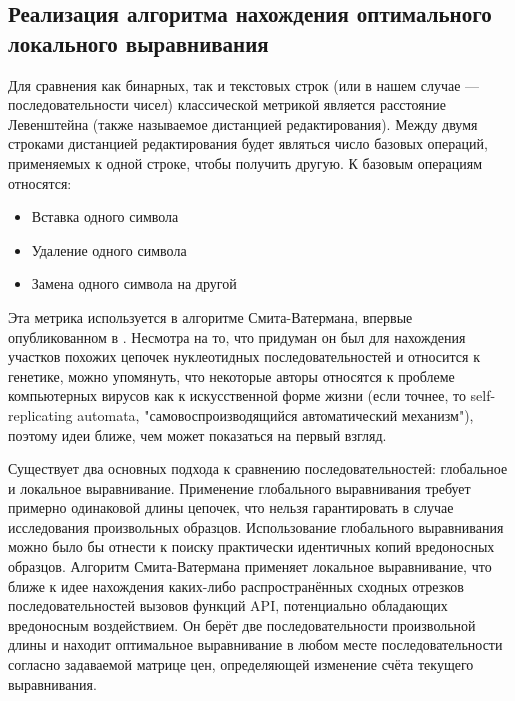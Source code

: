\subsection {Реализация алгоритма нахождения оптимального локального выравнивания}
Для сравнения как бинарных, так и текстовых строк (или в нашем случае --- последовательности чисел) классической метрикой является расстояние Левенштейна (также называемое дистанцией редактирования). Между двумя строками дистанцией редактирования будет являться число базовых операций, применяемых к одной строке, чтобы получить другую. К базовым операциям относятся:
\begin {itemize}
	\item Вставка одного символа
	\item Удаление одного символа
	\item Замена одного символа на другой
\end {itemize}
Эта  метрика используется в алгоритме Смита-Ватермана, впервые опубликованном в \cite{LOCALALIGNMENT}. Несмотра на то, что придуман он был для нахождения участков похожих цепочек нуклеотидных последовательностей и относится к генетике, можно упомянуть, что некоторые авторы \cite{BLACKBOOK} относятся к проблеме компьютерных вирусов как к искусственной форме жизни (если точнее, то self-replicating automata, "самовоспроизводящийся автоматический механизм"), поэтому идеи ближе, чем может показаться на первый взгляд.

Существует два основных подхода к сравнению последовательностей: глобальное и локальное выравнивание. Применение глобального выравнивания требует примерно одинаковой длины цепочек, что нельзя гарантировать в случае исследования произвольных образцов. Использование глобального выравнивания можно было бы отнести к поиску практически идентичных копий вредоносных образцов. Алгоритм Смита-Ватермана применяет локальное выравнивание, что ближе к идее нахождения каких-либо распространённых сходных отрезков последовательностей вызовов функций API, потенциально обладающих вредоносным воздействием. Он берёт две последовательности произвольной длины и находит оптимальное выравнивание в любом месте последовательности согласно задаваемой матрице цен, определяющей изменение счёта текущего выравнивания. 

